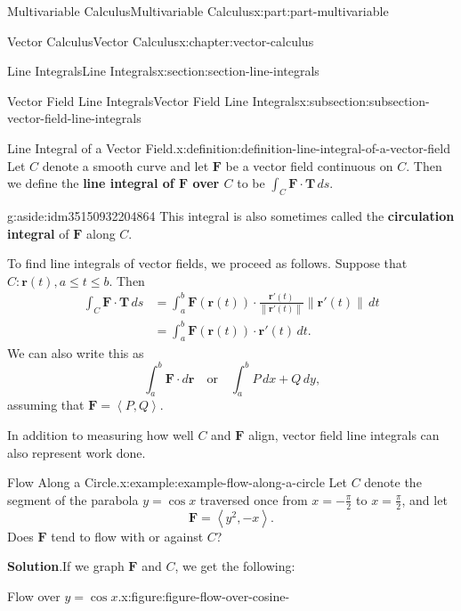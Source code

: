 \documentclass[twoside,10pt,]{tufte-book}
\newcommand{\blocktitlefont}{\relax}
\newcommand{\terminology}[1]{\textbf{#1}}
\numberwithin{equation}{part}
\newcommand{\vb}[1]{\mathbf{#1}}
\newcommand{\norm}[1]{\left\| #1 \right\|}
\newcommand{\dotprod}[1]{\left\langle #1 \right\rangle}
\newcommand{\qq}[1]{\quad\text{#1}\quad}
\newcommand{\amp}{&}
\begin{document}
\begin{partptx}{Multivariable Calculus}{}{Multivariable Calculus}{}{}{x:part:part-multivariable}
\begin{chapterptx}{Vector Calculus}{}{Vector Calculus}{}{}{x:chapter:vector-calculus}
\begin{sectionptx}{Line Integrals}{}{Line Integrals}{}{}{x:section:section-line-integrals}
\begin{subsectionptx}{Vector Field Line Integrals}{}{Vector Field Line Integrals}{}{}{x:subsection:subsection-vector-field-line-integrals}
\begin{definition}{Line Integral of a Vector Field.}{x:definition:definition-line-integral-of-a-vector-field}%
%
Let \(C\) denote a smooth curve and let \(\vb{F}\) be a vector field continuous on \(C\). Then we define the \terminology{line integral of \(\vb{F}\) over \(C\)} to be \(\int_{C}\vb{F}\cdot\vb{T}\,ds\).%
\begin{aside}{}{g:aside:idm35150932204864}%
This integral is also sometimes called the \terminology{circulation integral} of \(\vb{F}\) along \(C\).%
\end{aside}
\end{definition}
To find line integrals of vector fields, we proceed as follows. Suppose that \(C:\vb{r}(t), a\leq t\leq b\). Then%
\begin{align*}
\int_{C}\vb{F}\cdot\vb{T}\,ds \amp = \int_{a}^{b}\vb{F}(\vb{r}(t))\cdot\frac{\vb{r}'(t)}{\norm{\vb{r}'(t)}}\norm{\vb{r}'(t)}\,dt \\
\amp = \int_{a}^{b}\vb{F}(\vb{r}(t))\cdot\vb{r}'(t)\,dt \text{.}
\end{align*}
We can also write this as%
\begin{equation*}
\int_{a}^{b}\vb{F}\cdot d\vb{r} \qq{or} \int_{a}^{b} P\,dx + Q\,dy\text{,}
\end{equation*}
assuming that \(\vb{F} = \dotprod{P,Q}\).%
\par
In addition to measuring how well \(C\) and \(\vb{F}\) align, vector field line integrals can also represent work done.%
\begin{example}{Flow Along a Circle.}{x:example:example-flow-along-a-circle}%
Let \(C\) denote the segment of the parabola \(y = \cos x\) traversed once from \(x = -\frac{\pi}{2}\) to \(x = \frac{\pi}{2}\), and let%
\begin{equation*}
\vb{F} = \dotprod{y^{2}, -x}\text{.}
\end{equation*}
Does \(\vb{F}\) tend to flow with or against \(C\)?%
\par\smallskip%
\noindent\textbf{\blocktitlefont Solution}.\hypertarget{g:solution:idm35150932196416}{}\quad{}If we graph \(\vb{F}\) and \(C\), we get the following: \begin{figureptx}{Flow over \(y = \cos x\).}{x:figure:figure-flow-over-cosine-}{}%
\begin{image}{0}{1}{0}%

\end{image}
\end{figureptx}
\end{example}
\end{subsectionptx}
\end{sectionptx}
\end{chapterptx}
\end{partptx}
\end{document}
